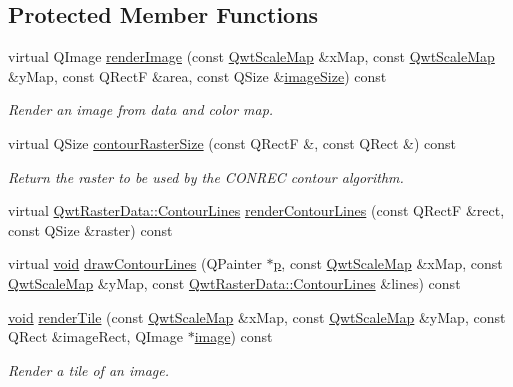 \subsection*{Protected Member Functions}
\begin{DoxyCompactItemize}
\item 
virtual Q\-Image \hyperlink{class_qwt_plot_spectrogram_a99fa9694347e6f06240538af88385ca6}{render\-Image} (const \hyperlink{class_qwt_scale_map}{Qwt\-Scale\-Map} \&x\-Map, const \hyperlink{class_qwt_scale_map}{Qwt\-Scale\-Map} \&y\-Map, const Q\-Rect\-F \&area, const Q\-Size \&\hyperlink{glext_8h_aec2b86da467cc9c4b739b07069de8cfb}{image\-Size}) const 
\begin{DoxyCompactList}\small\item\em Render an image from data and color map. \end{DoxyCompactList}\item 
virtual Q\-Size \hyperlink{class_qwt_plot_spectrogram_aa8baf22cfbfe9a0470fd17a251f7a8da}{contour\-Raster\-Size} (const Q\-Rect\-F \&, const Q\-Rect \&) const 
\begin{DoxyCompactList}\small\item\em Return the raster to be used by the C\-O\-N\-R\-E\-C contour algorithm. \end{DoxyCompactList}\item 
virtual \hyperlink{class_qwt_raster_data_adc6679160a229992f0870a2b784985f3}{Qwt\-Raster\-Data\-::\-Contour\-Lines} \hyperlink{class_qwt_plot_spectrogram_aad79c66b4ab2b64f368378691f562b56}{render\-Contour\-Lines} (const Q\-Rect\-F \&rect, const Q\-Size \&raster) const 
\item 
virtual \hyperlink{group___u_a_v_objects_plugin_ga444cf2ff3f0ecbe028adce838d373f5c}{void} \hyperlink{class_qwt_plot_spectrogram_aebd2c5ee80b3131138d4a55096962912}{draw\-Contour\-Lines} (Q\-Painter $\ast$\hyperlink{glext_8h_aa5367c14d90f462230c2611b81b41d23}{p}, const \hyperlink{class_qwt_scale_map}{Qwt\-Scale\-Map} \&x\-Map, const \hyperlink{class_qwt_scale_map}{Qwt\-Scale\-Map} \&y\-Map, const \hyperlink{class_qwt_raster_data_adc6679160a229992f0870a2b784985f3}{Qwt\-Raster\-Data\-::\-Contour\-Lines} \&lines) const 
\item 
\hyperlink{group___u_a_v_objects_plugin_ga444cf2ff3f0ecbe028adce838d373f5c}{void} \hyperlink{class_qwt_plot_spectrogram_a122ad763c5195de93cac900bd3bcb112}{render\-Tile} (const \hyperlink{class_qwt_scale_map}{Qwt\-Scale\-Map} \&x\-Map, const \hyperlink{class_qwt_scale_map}{Qwt\-Scale\-Map} \&y\-Map, const Q\-Rect \&image\-Rect, Q\-Image $\ast$\hyperlink{glext_8h_a4f252db605f5b9117603096756e79824}{image}) const 
\begin{DoxyCompactList}\small\item\em Render a tile of an image. \end{DoxyCompactList}\end{DoxyCompactItemize}


